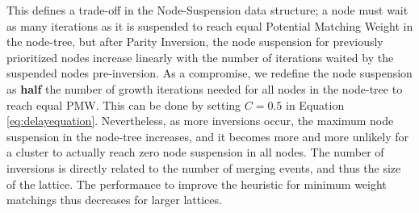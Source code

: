 This defines a trade-off in the Node-Suspension data structure; a node must wait as many iterations as it is suspended to reach equal Potential Matching Weight in the node-tree, but after Parity Inversion, the node suspension for previously prioritized nodes increase linearly with the number of iterations waited by the suspended nodes pre-inversion. As a compromise, we redefine the node suspension as \textbf{half} the number of growth iterations needed for all nodes in the node-tree to reach equal PMW. This can be done by setting $C=0.5$ in Equation \eqref{eq:delayequation}. Nevertheless, as more inversions occur, the maximum node suspension in the node-tree increases, and it becomes more and more unlikely for a cluster to actually reach zero node suspension in all nodes. The number of inversions is directly related to the number of merging events, and thus the size of the lattice. The performance to improve the heuristic for minimum weight matchings thus decreases for larger lattices. 

